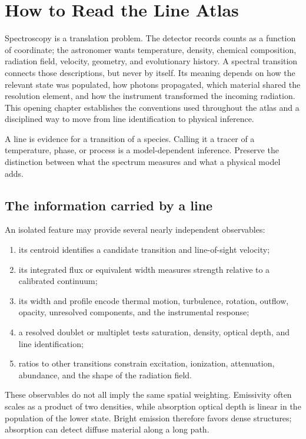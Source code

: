 \chapter{How to Read the Line Atlas}
\label{chap:foundations}

Spectroscopy is a translation problem.  The detector records counts as a
function of coordinate; the astronomer wants temperature, density, chemical
composition, radiation field, velocity, geometry, and evolutionary history.
A spectral transition connects those descriptions, but never by itself.  Its
meaning depends on how the relevant state was populated, how photons propagated,
which material shared the resolution element, and how the instrument transformed
the incoming radiation.  This opening chapter establishes the conventions used
throughout the atlas and a disciplined way to move from line identification to
physical inference.

\begin{conceptbox}
A line is evidence for a transition of a species.  Calling it a tracer of a
temperature, phase, or process is a model-dependent inference.  Preserve the
distinction between what the spectrum measures and what a physical model adds.
\end{conceptbox}

\section{The information carried by a line}

An isolated feature may provide several nearly independent observables:
\begin{enumerate}[label=\arabic*.]
  \item its centroid identifies a candidate transition and line-of-sight velocity;
  \item its integrated flux or equivalent width measures strength relative to a
        calibrated continuum;
  \item its width and profile encode thermal motion, turbulence, rotation,
        outflow, opacity, unresolved components, and the instrumental response;
  \item a resolved doublet or multiplet tests saturation, density, optical depth,
        and line identification;
  \item ratios to other transitions constrain excitation, ionization, attenuation,
        abundance, and the shape of the radiation field.
\end{enumerate}
These observables do not all imply the same spatial weighting.  Emissivity often
scales as a product of two densities, while absorption optical depth is linear in
the population of the lower state.  Bright emission therefore favors dense
structures; absorption can detect diffuse material along a long path.

